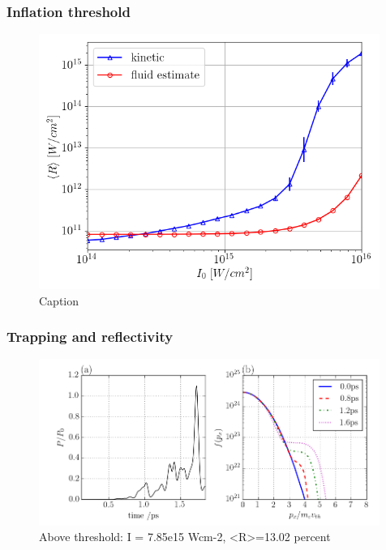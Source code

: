 \subsubsection{Inflation threshold}
\begin{figure}
    \centering
    \includegraphics[width=0.99\textwidth]{Chapters/C4_iSRS/012_kinetic_fluid.png}
    \caption{Caption}
    \label{fig:0.12_inflation_threshold}
\end{figure}{}
\subsubsection{Trapping and reflectivity}
\begin{figure}
    \centering
    \includegraphics[width=0.99\textwidth]{Chapters/C4_iSRS/012_785e15_refl_dist.png}
    \caption{Above threshold: I = 7.85e15 Wcm-2, <R>=13.02 percent}
    \label{fig:012_refl_dist}
\end{figure}{}
